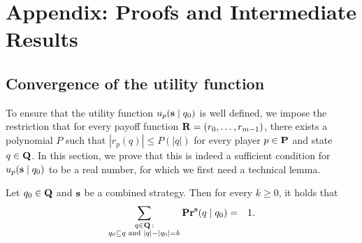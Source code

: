 
\section{Appendix: Proofs and Intermediate Results}
\subsection{Convergence of the utility function}
\label{sec-conver}

To ensure that the utility function $u_p(\mathbf{s} \mid q_0)$ is well defined, we impose the restriction that for every payoff function $\mathbf{R} = (r_0, \ldots, r_{m-1})$, there exists a polynomial $P$ such that $|r_p(q)| \leq P(|q|)$ for every player $p \in \mathbf{P}$ and state $q \in \mathbf{Q}$. In this section, we prove that this is indeed a sufficient condition for $u_p(\mathbf{s} \mid q_0)$ to be a real number, for which we first need a technical lemma. 

\begin{mylem}\label{lem-prop-k}
Let $q_0 \in \mathbf{Q}$ and $\mathbf{s}$ be a combined strategy. Then for every $k \geq 0$, it holds that
\begin{eqnarray*}
\sum_{\substack{q \in \mathbf{Q} \,: \\ q_0 \subseteq q \text{ {\rm and} } |q| - |q_0| = k}} \mathbf{Pr}^{\mathbf{s}}(q \mid q_0) & = & 1.
\end{eqnarray*}
\end{mylem}

